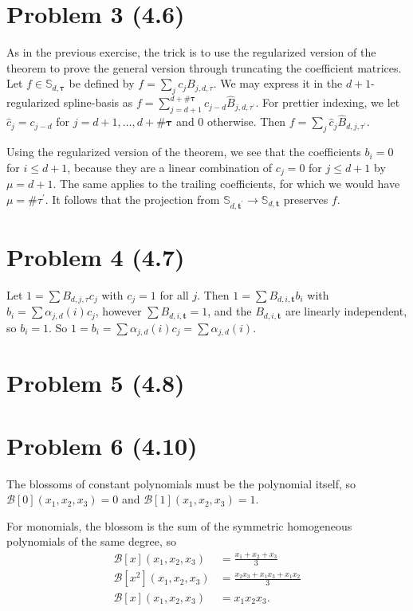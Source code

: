 \documentclass{article}
\begin{document}
\section*{Problem 3 (4.6)}

As in the previous exercise, the trick is to use the regularized version of the theorem to prove the general version
through truncating the coefficient matrices.
Let $f\in \mathbb S_{d,\mathbf \tau}$ be defined by $f=\sum_j c_j B_{j,d,\tau}$.
We may express it in the $d + 1$-regularized spline-basis as $f=\sum_{j=d + 1}^{d + \# \mathbf \tau} c_{j - d} \hat B_{j,d,\tau^\prime}$.
For prettier indexing, we let $\hat c_j=c_{j - d}$ for $j=d + 1,\ldots, d + \# \mathbf \tau$ and $0$ otherwise.
Then $f=\sum_j \hat c_j \hat B_{d,j,\tau^\prime}$.

Using the regularized version of the theorem, we see that the coefficients $b_i=0$ for $i\leq d + 1$,
because they are a linear combination of $c_j=0$ for $j\leq d + 1$ by $\mu=d + 1$.
The same applies to the trailing coefficients, for which we would have $\mu = \# \tau^\prime$.
It follows that the projection from $\mathbb S_{d,\mathbf t^\prime}\to \mathbb S_{d,\mathbf t}$ preserves $f$.


\section*{Problem 4 (4.7)}
Let $1 = \sum B_{d,j,\tau}c_j$ with $c_j=1$ for all $j$.
Then $1 = \sum B_{d,i,\mathbf t} b_i$ with $b_i=\sum \alpha_{j,d}(i) c_j$,
however $\sum B_{d,i,\mathbf t}=1$, and the $B_{d,i,\mathbf t}$ are linearly independent,
so $b_i = 1$.
So $1=b_i = \sum\alpha_{j,d}(i)c_j=\sum\alpha_{j,d}(i)$.

\section*{Problem 5 (4.8)}





\section*{Problem 6 (4.10)}
The blossoms of constant polynomials must be the polynomial itself,
so $\mathcal B[0](x_1,x_2,x_3) = 0$ and $\mathcal B[1](x_1,x_2,x_3) = 1$.

For monomials, the blossom is the sum of the symmetric homogeneous polynomials of the same degree,
so
\begin{align*}
    \mathcal B[x](x_1,x_2,x_3) 
    &= \frac{x_1 + x_2 + x_3} 3\\
    \mathcal B[x^2](x_1,x_2,x_3) 
    &= \frac{x_2x_3 + x_1x_3 + x_1x_2} 3\\
    \mathcal B[x](x_1,x_2,x_3) 
    &= x_1x_2x_3.
\end{align*}
\end{document}
